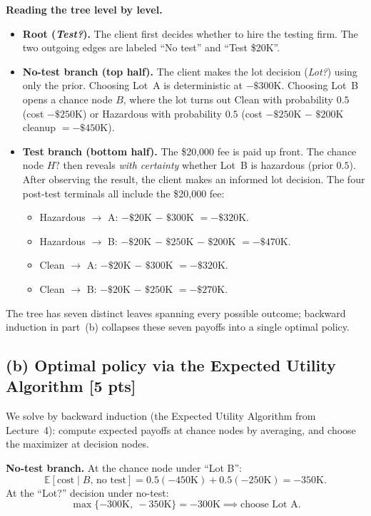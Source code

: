 \documentclass[12pt]{article}
\newcommand{\EE}{\mathbb{E}}
\begin{document}
\textbf{Reading the tree level by level.}
\begin{itemize}[leftmargin=1.5em,itemsep=2pt]
  \item \textbf{Root (\emph{Test?}).} The client first decides whether to hire the testing firm. The two outgoing edges are labeled ``No test'' and ``Test \$20K''.
  \item \textbf{No-test branch (top half).} The client makes the lot decision (\emph{Lot?}) using only the prior. Choosing Lot~A is deterministic at $-\$300$K. Choosing Lot~B opens a chance node $B$, where the lot turns out Clean with probability $0.5$ (cost $-\$250$K) or Hazardous with probability $0.5$ (cost $-\$250$K $-$ $\$200$K cleanup $= -\$450$K).
  \item \textbf{Test branch (bottom half).} The \$20{,}000 fee is paid up front. The chance node $H?$ then reveals \emph{with certainty} whether Lot~B is hazardous (prior $0.5$). After observing the result, the client makes an informed lot decision. The four post-test terminals all include the \$20{,}000 fee:
  \begin{itemize}[leftmargin=1.4em,itemsep=0pt]
    \item Hazardous $\to$ A: $-\$20$K $-$ $\$300$K $= -\$320$K.
    \item Hazardous $\to$ B: $-\$20$K $-$ $\$250$K $-$ $\$200$K $= -\$470$K.
    \item Clean $\to$ A: $-\$20$K $-$ $\$300$K $= -\$320$K.
    \item Clean $\to$ B: $-\$20$K $-$ $\$250$K $= -\$270$K.
  \end{itemize}
\end{itemize}
The tree has seven distinct leaves spanning every possible outcome; backward induction in part~(b) collapses these seven payoffs into a single optimal policy.

\subsection*{(b) Optimal policy via the Expected Utility Algorithm \hfill [5 pts]}

We solve by backward induction (the Expected Utility Algorithm from Lecture~4): compute expected payoffs at chance nodes by averaging, and choose the maximizer at decision nodes.

\textbf{No-test branch.} At the chance node under ``Lot B'':
\[
  \EE[\text{cost} \mid B,\,\text{no test}] = 0.5(-450\text{K}) + 0.5(-250\text{K}) = -350\text{K}.
\]
At the ``Lot?'' decision under no-test:
\[
  \max\{-300\text{K},\ -350\text{K}\} = -300\text{K} \implies \text{choose Lot A}.
\]
\end{document}
